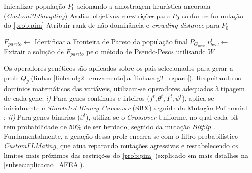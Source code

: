 \begin{algorithm}[htb]
\caption{Processo Evolutivo AFEA para a Rodada $t$ do \cref{Alg:esquemaFL}}
\label{Alg:nsgaii}

Inicializar população $P_0$ acionando a amostragem heurística ancorada (\textit{CustomFLSampling})\; \label{linha:alg2_init}
Avaliar objetivos e restrições para $P_0$ conforme formulação do \ref{prob:pim}\; \label{linha:alg2_eval_p0}
Atribuir rank de não-dominância e \textit{crowding distance} para $P_0$\; \label{linha:alg2_rank}

$F_{pareto} \leftarrow$ Identificar a Fronteira de Pareto da população final $P_{G_{max}}$\; \label{linha:alg2_fronteira}
$v_{best}^t \leftarrow$ Extrair a solução de $F_{pareto}$ pelo método de Pseudo-Pesos utilizando $W$\; \label{linha:alg2_pseudo}
\; \label{linha:alg2_return}
\end{algorithm}

Os operadores genéticos são aplicados sobre os pais selecionados para gerar a prole $Q_g$ (linhas \ref{linha:alg2_cruzamento} a \ref{linha:alg2_reparo}). Respeitando os domínios matemáticos das variáveis, utilizam-se operadores adequados à tipagem de cada gene: \textit{i)} Para genes contínuos e inteiros ($f^t, \theta^t, T^t, \psi^t$), aplica-se inicialmente o \textit{Simulated Binary Crossover} (SBX) seguido da Mutação Polinomial \cite{deb:SBX}; \textit{ii)} Para genes binários ($\beta^t$), utiliza-se o \textit{Crossover} Uniforme, no qual cada bit tem probabilidade de 50\% de ser herdado, seguido da mutação \textit{Bitflip} \cite{deb:nsga2}. Fundamentalmente, a geração dessa prole encerra-se com o filtro probabilístico \textit{CustomFLMating}, que atua reparando mutações agressivas e restabelecendo os limites mais próximos das restrições do \ref{prob:pim} (explicado em mais detalhes na \cref{subsec:aplicacao_AFEA}).

